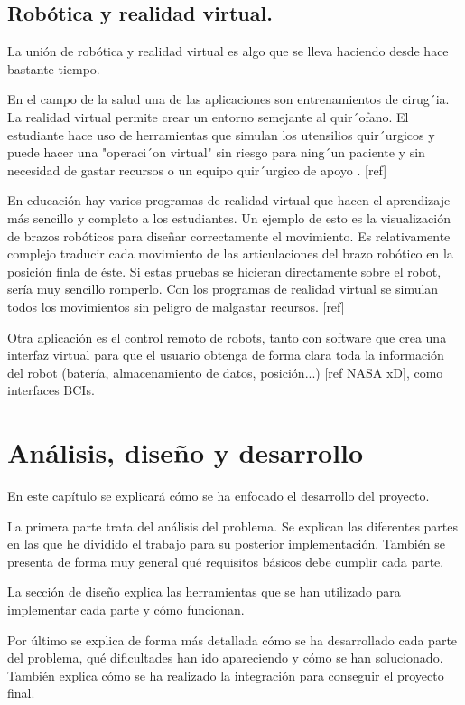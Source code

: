 \documentclass[twoside, 12pt]{epstfg}
\begin{document}
\section{Robótica y realidad virtual.} 
\label{sec:robotica y VR}
La unión de robótica y realidad virtual es algo que se lleva haciendo desde hace bastante tiempo.

En el campo de la salud una de las aplicaciones son entrenamientos de cirug´ia. La realidad virtual permite crear un entorno semejante al quir´ofano. El estudiante hace uso de herramientas que simulan los utensilios quir´urgicos y puede hacer una "operaci´on virtual" sin riesgo para ning´un paciente y sin necesidad de gastar recursos o un equipo quir´urgico de apoyo . [ref]

En educación hay varios programas de realidad virtual que hacen el aprendizaje más sencillo y completo a los estudiantes. Un ejemplo de esto es la visualización de brazos robóticos para diseñar correctamente el movimiento.
Es relativamente complejo traducir cada movimiento de las articulaciones del brazo robótico en la posición finla de éste. Si estas pruebas se hicieran directamente sobre el robot, sería muy sencillo romperlo. Con los programas de realidad virtual se simulan todos los movimientos sin peligro de malgastar recursos. [ref]

Otra aplicación es el control remoto de robots, tanto con software que crea una interfaz virtual para que el usuario obtenga de forma clara toda la información del robot (batería, almacenamiento de datos, posición...) [ref NASA xD], como interfaces BCIs.


\chapter{Análisis, diseño y desarrollo}
\label{chap:sistemadesarrollado}
En este capítulo se explicará cómo se ha enfocado el desarrollo del proyecto.

La primera parte trata del análisis del problema. Se explican las diferentes partes en las que he dividido el trabajo para su posterior implementación.
También se presenta de forma muy general qué requisitos básicos debe cumplir cada parte.

La sección de diseño explica las herramientas que se han utilizado para implementar cada parte y cómo funcionan.

Por último se explica de forma más detallada cómo se ha desarrollado cada parte del problema, qué dificultades han ido apareciendo y cómo se han solucionado. También explica cómo se ha realizado la integración para conseguir el proyecto final.
\end{document}
